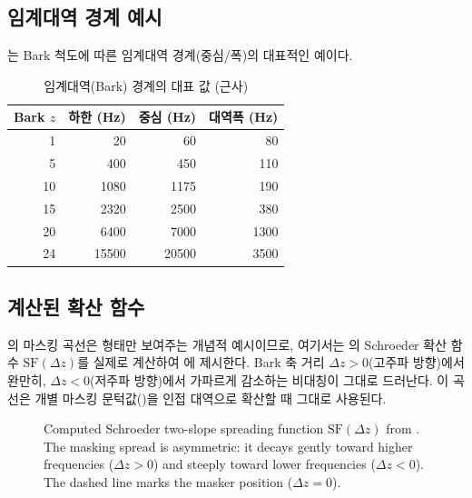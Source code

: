 \documentclass[11pt,a4paper]{article}
\newcommand{\dz}{\Delta z}                             %
\begin{document}
\subsection{임계대역 경계 예시}
는 Bark 척도에 따른 임계대역 경계(중심/폭)의 대표적인 예이다.

\begin{table}[htbp]
  \centering
  \caption{임계대역(Bark) 경계의 대표 값 (근사)}
  \label{tab:cb}
  \begin{tabular}{@{}rrrr@{}}
    \toprule
    Bark $z$ & 하한 (\si{\hertz}) & 중심 (\si{\hertz}) & 대역폭 (\si{\hertz}) \\
    \midrule
    1  & 20   & 60   & 80  \\
    5  & 400  & 450  & 110 \\
    10 & 1080 & 1175 & 190 \\
    15 & 2320 & 2500 & 380 \\
    20 & 6400 & 7000 & 1300 \\
    24 & 15500 & 20500 & 3500 \\
    \bottomrule
  \end{tabular}
\end{table}

\subsection{계산된 확산 함수}
의 마스킹 곡선은 형태만 보여주는 개념적 예시이므로, 여기서는
의 Schroeder 확산 함수 $\mathrm{SF}(\dz)$를 실제로 계산하여
에 제시한다. Bark 축 거리 $\dz>0$(고주파 방향)에서 완만히,
$\dz<0$(저주파 방향)에서 가파르게 감소하는 비대칭이 그대로 드러난다. 이 곡선은
개별 마스킹 문턱값()을 인접 대역으로 확산할 때 그대로 사용된다.

\begin{figure}[htbp]
  \centering
  \caption{Computed Schroeder two-slope spreading function $\mathrm{SF}(\dz)$
           from . The masking spread is asymmetric: it decays
           gently toward higher frequencies ($\dz>0$) and steeply toward lower
           frequencies ($\dz<0$). The dashed line marks the masker position
           ($\dz=0$).}
  \label{fig:spread}
\end{figure}
\end{document}

